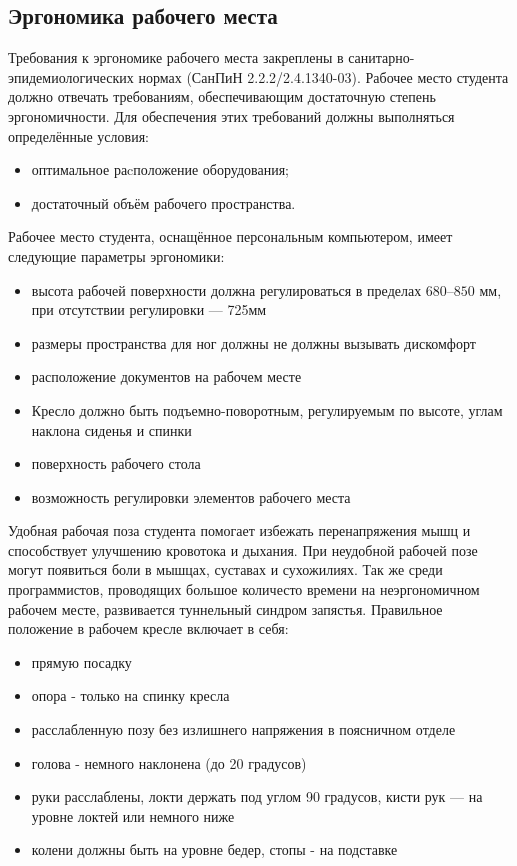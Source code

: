 \subsection{Эргономика рабочего места}

\label{erg}

Требования к эргономике рабочего места закреплены в санитарно-эпидемиологических нормах (СанПиН 2.2.2/2.4.1340-03). Рабочее место студента должно отвечать требованиям, обеспечивающим достаточную степень эргономичности. Для обеспечения этих требований должны выполняться определённые условия: 
\begin{itemize}
\item оптимальное раcположение оборудования;
\item достаточный объём рабочего пространства.
\end{itemize}

Рабочее место студента, оснащённое персональным компьютером, имеет следующие параметры эргономики: 
\begin{itemize}
\item высота рабочей поверхности должна регулироваться в пределах $680–850$ мм, при отсутствии регулировки — 725мм
\item размеры пространства для ног должны не должны вызывать дискомфорт
\item расположение документов на рабочем месте
\item Кресло должно быть подъемно-поворотным, регулируемым по высоте, углам наклона сиденья и спинки
\item поверхность рабочего стола
\item возможность регулировки элементов рабочего места
\end{itemize}

Удобная рабочая поза студента помогает избежать перенапряжения мышц и спо\-собствует улучшению кровотока и дыхания. При неудобной рабочей позе могут появиться боли в мышцах, суставах и сухожилиях. Так же среди программистов, проводящих большое количесто времени на неэргономичном рабочем месте, развивается туннельный синдром запястья.
Правильное положение в рабочем кресле включает в себя:
\begin{itemize}
\item прямую посадку
\item опора - только на спинку кресла
\item расслабленную позу без излишнего напряжения в поясничном отделе
\item голова  - немного наклонена (до 20 градусов)
\item руки расслаблены, локти держать под углом 90 градусов, кисти рук — на уровне локтей или немного ниже
\item колени должны быть на уровне бедер, стопы - на подставке
\end{itemize}

